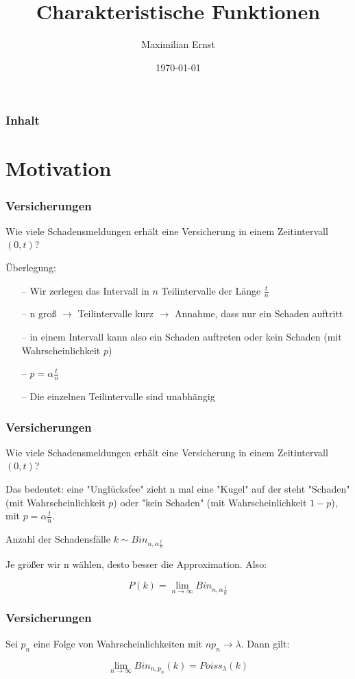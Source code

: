 \documentclass{beamer}
\begin{document}
\title{Charakteristische Funktionen}
\author{Maximilian Ernst}
\date{\today}
\begin{frame}
\titlepage
\end{frame}

\begin{frame}\frametitle{Inhalt}\tableofcontents\end{frame}

\section{Motivation}
\begin{frame}
\frametitle{Versicherungen}
Wie viele Schadensmeldungen erhält eine Versicherung in einem Zeitintervall $(0, t)$?

Überlegung:
\hfill \newline
\begin{itemize}
    \item[--] Wir zerlegen das Intervall in $n$ Teilintervalle der Länge $\frac{t}{n}$
    \item[--] n groß $\to$ Teilintervalle kurz $\to$ Annahme, dass nur ein Schaden auftritt
    \item[--] in einem Intervall kann also ein Schaden auftreten oder kein Schaden (mit Wahrscheinlichkeit $p$)
    \item[--] $p = \alpha \frac{t}{n}$
    \item[--] Die einzelnen Teilintervalle sind unabhängig
\end{itemize}
\end{frame}

\begin{frame}
\frametitle{Versicherungen}
Wie viele Schadensmeldungen erhält eine Versicherung in einem Zeitintervall $(0, t)$?

Das bedeutet: eine "Unglücksfee" zieht n mal eine "Kugel" auf der steht "Schaden" (mit Wahrscheinlichkeit $p$) oder "kein Schaden" (mit Wahrscheinlichkeit $1-p$), mit $p = \alpha \frac{t}{n}$.

Anzahl der Schadensfälle $k \sim Bin_{n, \alpha \frac{t}{n}}$

Je größer wir n wählen, desto besser die Approximation. Also:

$$P(k) = \lim_{n \to \infty} Bin_{n, \alpha \frac{t}{n}}$$
\end{frame}

\begin{frame}
\frametitle{Versicherungen}
Sei $p_n$ eine Folge von Wahrscheinlichkeiten mit $n p_n \to \lambda$. Dann gilt:

$$\lim_{n \to \infty} Bin_{n, p_n}(k) = Poiss_\lambda (k)$$
\end{frame}
\end{document}
